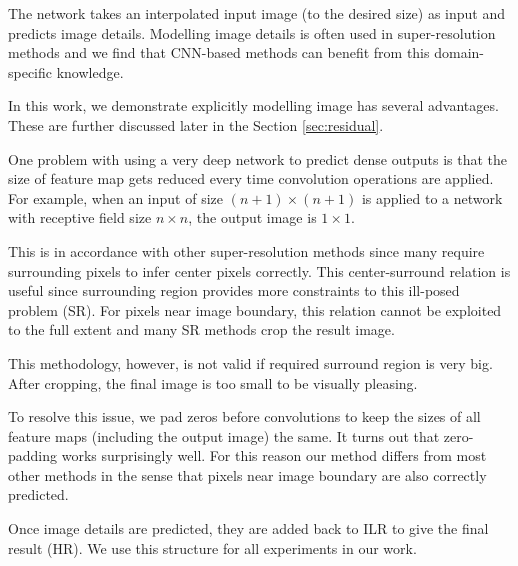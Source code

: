 \documentclass[10pt,twocolumn,letterpaper]{article}
\begin{document}
The network takes an interpolated input image (to the desired size) as input and predicts image details. Modelling image details is often used in super-resolution methods \cite{Timofte2013, Timofte, bevilacqua2012,bevilacqua2013super} and we find that CNN-based methods can benefit from this domain-specific knowledge.

In this work, we demonstrate explicitly modelling image has several advantages. These are further discussed later in the Section \ref{sec:residual}. 

One problem with using a very deep network to predict dense outputs is that the size of feature map gets reduced every time convolution operations are applied. For example,  when an input of size $(n+1)\times (n+1)$ is applied to a network with receptive field size $n\times n$, the output image is $1\times1$. 

This is in accordance with other super-resolution methods since many require surrounding pixels to infer center pixels correctly. This center-surround relation is useful since surrounding region provides more constraints to this ill-posed problem (SR). For pixels near image boundary, this relation cannot be exploited to the full extent and many SR methods crop the result image. 

This methodology, however, is not valid if required surround region is very big. After cropping, the final image is too small to be visually pleasing.

To resolve this issue, we pad zeros before convolutions to keep the sizes of all feature maps (including the output image) the same. It turns out that zero-padding works surprisingly well. For this reason our method differs from most other methods in the sense that pixels near image boundary are also correctly predicted.  

Once image details are predicted, they are added back to ILR to give the final result (HR). We use this structure for all experiments in our work.  
\end{document}
